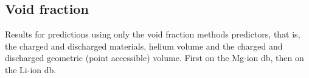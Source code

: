 







\subsection{Void fraction}
Results for predictions using only the void fraction methods predictors, that is, the charged and discharged materials, helium volume and the charged and discharged geometric (point accessible) volume. First on the Mg-ion db, then on the Li-ion db.


